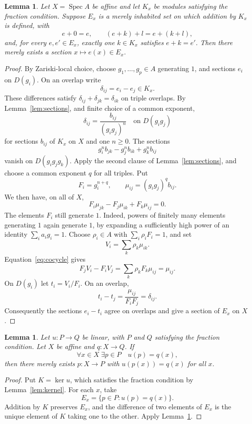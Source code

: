 \documentclass[11pt]{amsart}
\newtheorem{lemma}[theorem]{Lemma}
\theoremstyle{definition}
\newcommand{\Spec}{\operatorname{Spec}}
\begin{document}
\begin{lemma}\label{lem:additive-gluing}
Let $X=\Spec A$ be affine and let $K_x$ be modules satisfying the fraction
condition. Suppose $E_x$ is a merely inhabited set on which addition by
$K_x$ is defined, with
\[
 e+0=e,\qquad(e+k)+l=e+(k+l),
\]
and, for every $e,e'\in E_x$, exactly one $k\in K_x$ satisfies
$e+k=e'$. Then there merely exists a section $x\mapsto e(x)\in E_x$.
\end{lemma}
\begin{proof}
By Zariski-local choice, choose $g_1,\ldots,g_p\in A$ generating $1$,
and sections $e_i$ on $D(g_i)$. On an overlap write
\[
 \delta_{ij}=e_i-e_j\in K_x.
\]
These differences satisfy
$\delta_{ij}+\delta_{jk}=\delta_{ik}$ on triple overlaps.
By Lemma~\ref{lem:sections}, and finite choice of a common exponent,
\[
 \delta_{ij}=\frac{b_{ij}}{(g_ig_j)^n}
 \quad\text{on }D(g_ig_j)
\]
for sections $b_{ij}$ of $K_x$ on $X$ and one $n\geq0$.
The sections
\[
 g_i^n b_{jk}-g_j^n b_{ik}+g_k^n b_{ij}
\]
vanish on $D(g_ig_jg_k)$. Apply the second clause of
Lemma~\ref{lem:sections}, and choose a common exponent $q$ for all
triples. Put
\[
 F_i=g_i^{n+q},\qquad \mu_{ij}=(g_ig_j)^q b_{ij}.
\]
We then have, on all of $X$,
\begin{equation}\label{eq:cocycle}
 F_i\mu_{jk}-F_j\mu_{ik}+F_k\mu_{ij}=0.
\end{equation}
The elements $F_i$ still generate $1$. Indeed, powers of finitely many
elements generating $1$ again generate $1$, by expanding a sufficiently
high power of an identity $\sum_i a_ig_i=1$. Choose $\rho_i\in A$ with
$\sum_i\rho_iF_i=1$, and set
\[
 V_i=\sum_k\rho_k\mu_{ik}.
\]
Equation~\eqref{eq:cocycle} gives
\[
 F_jV_i-F_iV_j=\sum_k\rho_kF_k\mu_{ij}=\mu_{ij}.
\]
On $D(g_i)$ let $t_i=V_i/F_i$. On an overlap,
\[
 t_i-t_j=\frac{\mu_{ij}}{F_iF_j}=\delta_{ij}.
\]
Consequently the sections $e_i-t_i$ agree on overlaps and give a section
of $E_x$ on $X$.
\end{proof}

\begin{lemma}\label{lem:linear-choice}
Let $u:P\to Q$ be linear, with $P$ and $Q$ satisfying the fraction
condition. Let $X$ be affine and $q:X\to Q$. If
\[
 \forall x\in X\;\exists p\in P\quad u(p)=q(x),
\]
then there merely exists $p:X\to P$ with $u(p(x))=q(x)$ for all $x$.
\end{lemma}
\begin{proof}
Put $K=\ker u$, which satisfies the fraction condition by
Lemma~\ref{lem:kernel}. For each $x$, take
\[
 E_x=\{p\in P:u(p)=q(x)\}.
\]
Addition by $K$ preserves $E_x$, and the difference of two elements of
$E_x$ is the unique element of $K$ taking one to the other. Apply
Lemma~\ref{lem:additive-gluing}.
\end{proof}
\end{document}
